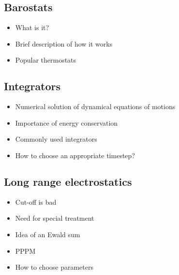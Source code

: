 \documentclass[9pt,bestpractices]{livecoms}
\begin{document}
\subsection{Barostats}
\begin{itemize}
\item What is it?
\item Brief description of how it works
\item Popular thermostats
\end{itemize}

\subsection{Integrators}
\begin{itemize}
\item Numerical solution of dynamical equations of motions
\item Importance of energy conservation
\item Commonly used integrators
\item How to choose an appropriate timestep?
\end{itemize}

\subsection{Long range electrostatics}
\begin{itemize}
\item Cut-off is bad
\item Need for special treatment
\item Idea of an Ewald sum
\item PPPM 
\item How to choose parameters
\end{itemize}
\end{document}
